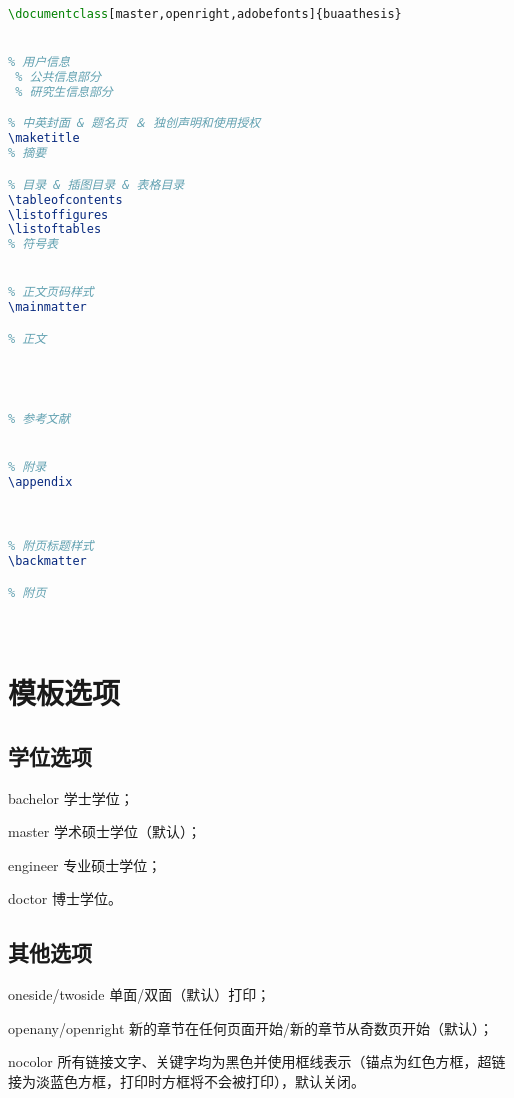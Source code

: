 \begin{lstlisting}[language={LaTeX}]
% !Mode:: "TeX:UTF-8"
\documentclass[master,openright,adobefonts]{buaathesis}


% 用户信息
 % 公共信息部分
 % 研究生信息部分

% 中英封面 & 题名页 ＆ 独创声明和使用授权
\maketitle
% 摘要

% 目录 & 插图目录 & 表格目录
\tableofcontents
\listoffigures
\listoftables
% 符号表


% 正文页码样式
\mainmatter

% 正文
	



% 参考文献


% 附录
\appendix



% 附页标题样式
\backmatter

% 附页




\end{lstlisting}
    
\section{模板选项}
\subsection{学位选项}
    \begin{description}
        \item{bachelor} 学士学位；
        \item{master} 学术硕士学位（默认）；
        \item{engineer} 专业硕士学位；
        \item{doctor} 博士学位。
    \end{description}

\subsection{其他选项}
    \begin{description}
        \item{oneside\slash twoside} 单面\slash 双面（默认）打印；
        \item{openany\slash openright} 新的章节在任何页面开始\slash 新的章节从奇数页开始（默认）；
        \item{nocolor} 所有链接文字、关键字均为黑色并使用框线表示（锚点为红色方框，超链接为淡蓝色方框，打印时方框将不会被打印），默认关闭。
    \end{description}

